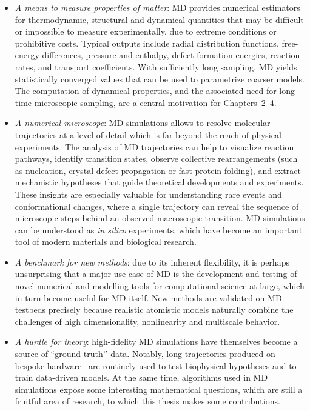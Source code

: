 \begin{itemize}
\item \textit{A means to measure properties of matter}: MD provides numerical estimators for thermodynamic, structural and dynamical quantities that may be difficult or impossible to measure experimentally, due to extreme conditions or prohibitive costs. Typical outputs include radial distribution functions, free-energy differences, pressure and enthalpy, defect formation energies, reaction rates, and transport coefficients. With sufficiently long sampling, MD yields statistically converged values that can be used to parametrize coarser models. The computation of dynamical properties, and the associated need for long-time microscopic sampling, are a central motivation for Chapters~2--4.
  \item \textit{A numerical microscope}: MD simulations allows to resolve molecular trajectories at a level of detail which is far beyond the reach of physical experiments. The analysis of MD trajectories can help to visualize reaction pathways, identify transition states, observe collective rearrangements (such as nucleation, crystal defect propagation or fast protein folding), and extract mechanistic hypotheses that guide theoretical developments and experiments. These insights are especially valuable for understanding rare events and conformational changes, where a single trajectory can reveal the sequence of microscopic steps behind an observed macroscopic transition. MD simulations can be understood as \textit{in silico} experiments, which have become an important tool of modern materials and biological research.
  \item \textit{A benchmark for new methods}: due to its inherent flexibility, it is perhaps unsurprising that a major use case of MD is the development and testing of novel numerical and modelling tools for computational science at large, which in turn become useful for MD itself. New methods are validated on MD testbeds precisely because realistic atomistic models naturally combine the challenges of high dimensionality, nonlinearity and multiscale behavior.
  \item \textit{A hurdle for theory}: high-fidelity MD simulations have themselves become a source of “ground truth’’ data. Notably, long trajectories produced on bespoke hardware~\cite{SDDKLSYBBCal08} are routinely used to test biophysical hypotheses and to train data-driven models. At the same time, algorithms used in MD simulations expose some interesting mathematical questions, which are still a fruitful area of research, to which this thesis makes some contributions.
\end{itemize}

